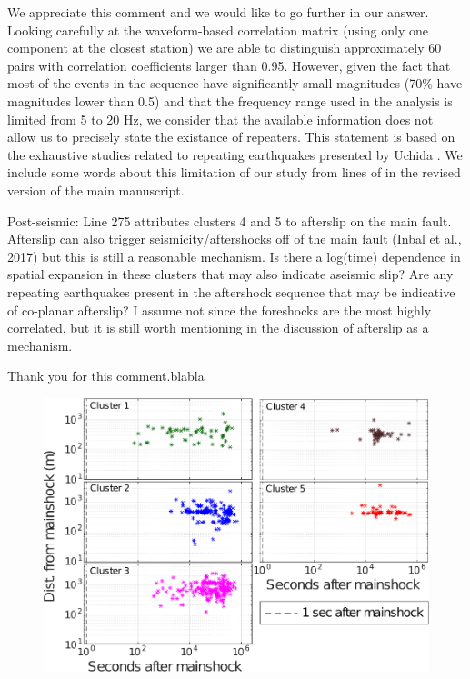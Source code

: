 \documentclass[10pt]{extarticle}
\begin{document}
\begin{Answer}
We appreciate this comment and we would like to go further in our answer. Looking carefully at the waveform-based correlation matrix (using only one component at the closest station) we are able to distinguish approximately 60 pairs with correlation coefficients larger than 0.95. However, given the fact that most of the events in the sequence have significantly small magnitudes (70\% have magnitudes lower than 0.5) and that the frequency range used in the analysis is limited from 5 to 20 Hz, we consider that the available information does not allow us to precisely state the existance of repeaters. This statement is based on the exhaustive studies related to repeating earthquakes presented by Uchida \citep{uchida2019,uchida2019repeating}. We include some words about this limitation of our study from lines    of in the revised version of the main manuscript. 
 \WorkInProgressRevTask
\end{Answer}
%
%



\begin{ReviewerComment}{2}
\noindent 
Post-seismic: Line 275 attributes clusters 4 and 5 to afterslip on the main fault. Afterslip can also trigger seismicity/aftershocks off of the main fault (Inbal et al., 2017) but this is still a reasonable mechanism. Is there a log(time) dependence in spatial expansion in these clusters that may also indicate aseismic slip? Are any repeating earthquakes present in the aftershock sequence that may be indicative of co-planar afterslip? I assume not since the foreshocks are the most highly correlated, but it is still worth mentioning in the discussion of afterslip as a mechanism.
\end{ReviewerComment}


\begin{Answer}
Thank you for this comment.blabla
\begin{figure}[!h]
\begin{center}
 \includegraphics[width=0.7\linewidth]{S3_loglog_time.png} 
\end{center}
\end{figure}
 \WorkInProgressRevTask
\end{Answer}
%
%
\end{document}
